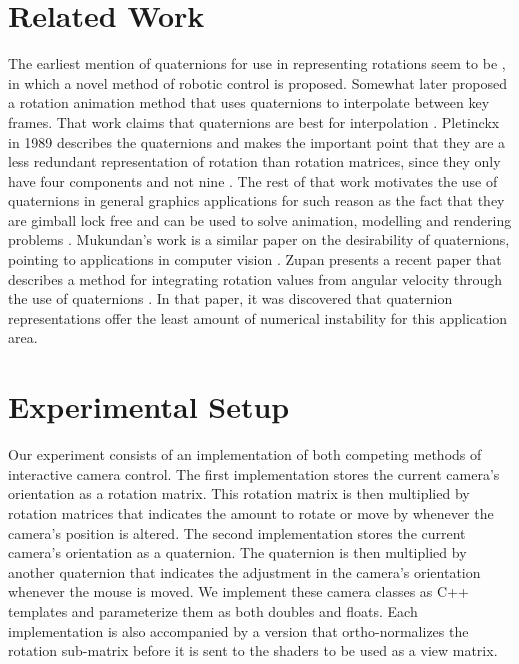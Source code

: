 \documentclass{acm_proc_article-sp}
\begin{document}
\section{Related Work}

The earliest mention of quaternions for use in representing rotations seem to be \parencite{taylor79}, in which a novel method of robotic control is proposed.
Somewhat later \parencite{schoemake85} proposed a rotation animation method that uses quaternions to interpolate between key frames.
That work claims that quaternions are best for interpolation \parencite[247]{schoemake85}.
Pletinckx in 1989 describes the quaternions and makes the important point that they are a less redundant representation of rotation than rotation matrices, since they only have four components and not nine \parencite[3]{pletinckx89}.
The rest of that work motivates the use of quaternions in general graphics applications for such reason as the fact that they are gimball lock free \parencite[4]{pletinckx89} and can be used to solve animation, modelling and rendering problems \parencite[12]{pletinckx89}.
Mukundan's work is a similar paper on the desirability of quaternions, pointing to applications in computer vision \parencite{mukundan02}.
Zupan presents a recent paper that describes a method for integrating rotation values from angular velocity through the use of quaternions \parencite{zupan11}.
In that paper, it was discovered that quaternion representations offer the least amount of numerical instability for this application area.

\section{Experimental Setup}

Our experiment consists of an implementation of both competing methods of interactive camera control.
The first implementation stores the current camera's orientation as a rotation matrix.
This rotation matrix is then multiplied by rotation matrices that indicates the amount to rotate or move by whenever the camera's position is altered.
The second implementation stores the current camera's orientation as a quaternion.
The quaternion is then multiplied by another quaternion that indicates the adjustment in the camera's orientation whenever the mouse is moved.
We implement these camera classes as C++ templates and parameterize them as both doubles and floats.
Each implementation is also accompanied by a version that ortho-normalizes the rotation sub-matrix before it is sent to the shaders to be used as a view matrix.
\end{document}
